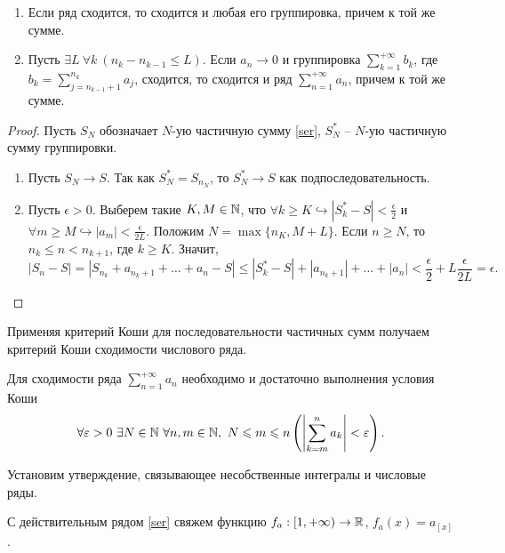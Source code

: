 \begin{lemma}
    \begin{enumerate}
        \item Если ряд сходится, то сходится и любая его группировка, причем к той же сумме.
        \item Пусть $\exists L \ \forall k \ (n_k - n_{k - 1} \leq L)$. Если $a_n \to 0$ и группировка $\sum_{k = 1}^{+\infty}b_{k}$, где $b_k = \sum_{j = n_{k - 1} + 1}^{n_k}a_{j}$, сходится, то сходится и ряд $\sum_{n = 1}^{+\infty}a_{n}$, причем к той же сумме.
    \end{enumerate}
\end{lemma}

\begin{proof}
    Пусть $S_N$ обозначает $N$-ую частичную сумму \ref{ser}, $S_{N}^{*}$ -- $N$-ую частичную сумму группировки.
    \begin{enumerate}
        \item Пусть $S_{N} \to S$. Так как $S_{N}^{*} = S_{n_{N}}$, то $S_{N}^{*} \to S$ как подпоследовательность.
        
        \item Пусть $\epsilon > 0$. Выберем такие $K, M \in \mathbb{N}$, что $\forall k \geq K \hookrightarrow \left| S_{k}^{*} - S \right| < \frac{\epsilon}{2}$ и $\forall m \geq M \hookrightarrow |a_{m}| < \frac{\epsilon}{2L}$. Положим $N = \max\{n_{K}, M + L\}$. Если $n \geq N$, то $n_k \leq n < n_{k+1}$, где $k \geq K$. Значит, 
        \[\left|S_{n} - S\right| = \left| S_{n_{k}} + a_{n_{k}+1} + \dots + a_{n} - S \right| \leq \left|S_{k}^{*} - S\right| + |a_{n_{k} + 1}| + \dots + |a_{n}| < \frac{\epsilon}{2} + L\frac{\epsilon}{2L} = \epsilon.\]
    \end{enumerate}
\end{proof}

Применяя критерий Коши для последовательности частичных сумм получаем критерий Коши сходимости числового ряда.

\begin{theorem}
    Для сходимости ряда $\sum_{n = 1}^{+\infty}a_{n}$ необходимо и достаточно выполнения условия Коши
    \[\forall \epsilon > 0 \ \exists N \in \N \ \forall n, m \in \N, \ N \leq m \leq n \left( \left| \sum_{k = m}^{n}a_{k} \right| < \epsilon \right).\]
\end{theorem}

Установим утверждение, связывающее несобственные интегралы и числовые ряды.

\begin{definition}
    С действительным рядом \ref{ser} свяжем функцию $f_{a}: [1, +\infty) \to \mathbb{R}$, $f_{a}(x) = a_{[x]}$.
\end{definition}


